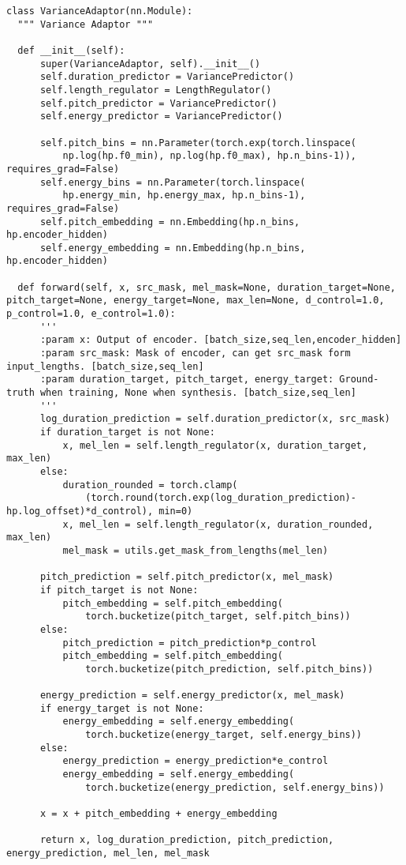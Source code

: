\documentclass[cn,10pt,math=newtx,citestyle=gb7714-2015,bibstyle=gb7714-2015]{elegantbook}
\begin{document}
\begin{lstlisting}
class VarianceAdaptor(nn.Module):
  """ Variance Adaptor """

  def __init__(self):
      super(VarianceAdaptor, self).__init__()
      self.duration_predictor = VariancePredictor()
      self.length_regulator = LengthRegulator()
      self.pitch_predictor = VariancePredictor()
      self.energy_predictor = VariancePredictor()

      self.pitch_bins = nn.Parameter(torch.exp(torch.linspace(
          np.log(hp.f0_min), np.log(hp.f0_max), hp.n_bins-1)), requires_grad=False)
      self.energy_bins = nn.Parameter(torch.linspace(
          hp.energy_min, hp.energy_max, hp.n_bins-1), requires_grad=False)
      self.pitch_embedding = nn.Embedding(hp.n_bins, hp.encoder_hidden)
      self.energy_embedding = nn.Embedding(hp.n_bins, hp.encoder_hidden)

  def forward(self, x, src_mask, mel_mask=None, duration_target=None, pitch_target=None, energy_target=None, max_len=None, d_control=1.0, p_control=1.0, e_control=1.0):
      '''
      :param x: Output of encoder. [batch_size,seq_len,encoder_hidden]
      :param src_mask: Mask of encoder, can get src_mask form input_lengths. [batch_size,seq_len]
      :param duration_target, pitch_target, energy_target: Ground-truth when training, None when synthesis. [batch_size,seq_len]
      '''
      log_duration_prediction = self.duration_predictor(x, src_mask)
      if duration_target is not None:
          x, mel_len = self.length_regulator(x, duration_target, max_len)
      else:
          duration_rounded = torch.clamp(
              (torch.round(torch.exp(log_duration_prediction)-hp.log_offset)*d_control), min=0)
          x, mel_len = self.length_regulator(x, duration_rounded, max_len)
          mel_mask = utils.get_mask_from_lengths(mel_len)

      pitch_prediction = self.pitch_predictor(x, mel_mask)
      if pitch_target is not None:
          pitch_embedding = self.pitch_embedding(
              torch.bucketize(pitch_target, self.pitch_bins))
      else:
          pitch_prediction = pitch_prediction*p_control
          pitch_embedding = self.pitch_embedding(
              torch.bucketize(pitch_prediction, self.pitch_bins))

      energy_prediction = self.energy_predictor(x, mel_mask)
      if energy_target is not None:
          energy_embedding = self.energy_embedding(
              torch.bucketize(energy_target, self.energy_bins))
      else:
          energy_prediction = energy_prediction*e_control
          energy_embedding = self.energy_embedding(
              torch.bucketize(energy_prediction, self.energy_bins))

      x = x + pitch_embedding + energy_embedding

      return x, log_duration_prediction, pitch_prediction, energy_prediction, mel_len, mel_mask
\end{lstlisting}
\end{document}
